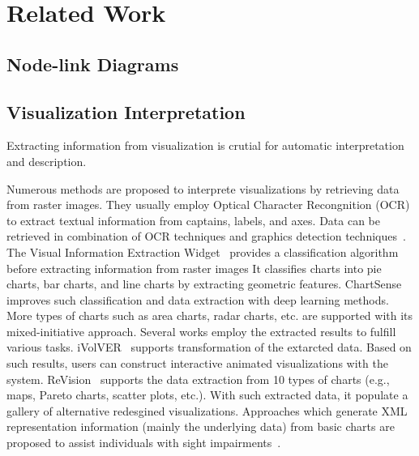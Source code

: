 \section{Related Work}\label{sec:relatedwork}
\subsection{Node-link Diagrams}
\subsection{Visualization Interpretation}
Extracting information from visualization is crutial for automatic interpretation and description.

Numerous methods are proposed to interprete visualizations by retrieving data from raster images.
They usually employ Optical Character Recongnition (OCR) to extract textual information from captains, labels, and axes.
Data can be retrieved in combination of OCR techniques and graphics detection techniques~\cite{DBLP:conf/icip/ZhouT00, DBLP:conf/doceng/HuangT07}.
The Visual Information Extraction Widget~\cite{DBLP:conf/icip/GaoZB12} provides a  classification algorithm before extracting information from raster images
It classifies charts into pie charts, bar charts, and line charts by extracting geometric features.
ChartSense~\cite{DBLP:conf/chi/JungKSHLKS17} improves such classification and data extraction with deep learning methods. More types of charts such as area charts, radar charts, etc. are supported with its mixed-initiative approach. 
Several works employ the extracted results to fulfill various tasks.
iVolVER~\cite{DBLP:conf/chi/MendezNV16} supports transformation of the extarcted data. Based on such results, users can construct interactive animated visualizations with the system.
ReVision~\cite{DBLP:conf/uist/SavvaKCFAH11} supports the data extraction from 10 types of charts (e.g., maps, Pareto charts, scatter plots, etc.). With such extracted data, it populate a gallery of alternative redesgined visualizations.
Approaches which generate XML representation information (mainly the underlying data) from basic charts are proposed to assist individuals with sight impairments~\cite{DBLP:conf/ismis/ChesterE05, DBLP:journals/tiis/CarberrySMDWGCSOM12, DBLP:journals/cgf/ChoiJPCE19}. 

